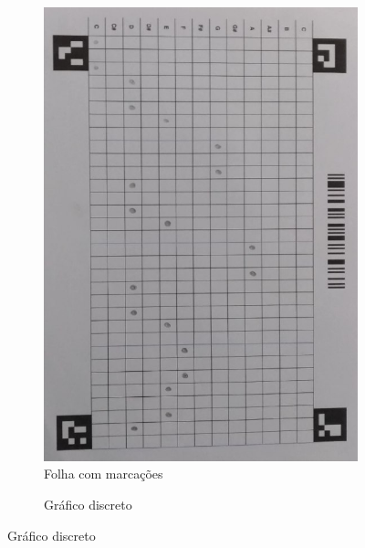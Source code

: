 \documentclass[12pt]{report}
\begin{document}
\begin{figure}[H]
  \centering
  \begin{subfigure}{0.4\textwidth}
    \centering
    \includegraphics[angle=90,origin=c,width=1\textwidth]{imagens/layout_preenchido.jpeg}
    \caption{Folha com marcações}
    \label{fig:layout_marcacao}
  \end{subfigure}
  \begin{subfigure}{0.5\textwidth}
    \centering
    \caption{Gráfico discreto}
    \label{fig:gráfico}
  \end{subfigure}%
\end{figure}
\end{document}
